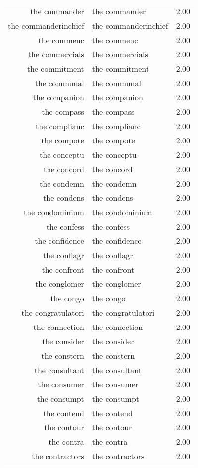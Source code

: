 \begin{table}[ht]
\begin{tabular}{rlr}
  the commander & the commander & 2.00 \\ 
  the commanderinchief & the commanderinchief & 2.00 \\ 
  the commenc & the commenc & 2.00 \\ 
  the commercials & the commercials & 2.00 \\ 
  the commitment & the commitment & 2.00 \\ 
  the communal & the communal & 2.00 \\ 
  the companion & the companion & 2.00 \\ 
  the compass & the compass & 2.00 \\ 
  the complianc & the complianc & 2.00 \\ 
  the compote & the compote & 2.00 \\ 
  the conceptu & the conceptu & 2.00 \\ 
  the concord & the concord & 2.00 \\ 
  the condemn & the condemn & 2.00 \\ 
  the condens & the condens & 2.00 \\ 
  the condominium & the condominium & 2.00 \\ 
  the confess & the confess & 2.00 \\ 
  the confidence & the confidence & 2.00 \\ 
  the conflagr & the conflagr & 2.00 \\ 
  the confront & the confront & 2.00 \\ 
  the conglomer & the conglomer & 2.00 \\ 
  the congo & the congo & 2.00 \\ 
  the congratulatori & the congratulatori & 2.00 \\ 
  the connection & the connection & 2.00 \\ 
  the consider & the consider & 2.00 \\ 
  the constern & the constern & 2.00 \\ 
  the consultant & the consultant & 2.00 \\ 
  the consumer & the consumer & 2.00 \\ 
  the consumpt & the consumpt & 2.00 \\ 
  the contend & the contend & 2.00 \\ 
  the contour & the contour & 2.00 \\ 
  the contra & the contra & 2.00 \\ 
  the contractors & the contractors & 2.00 \\ 

\end{tabular}
\end{table}
